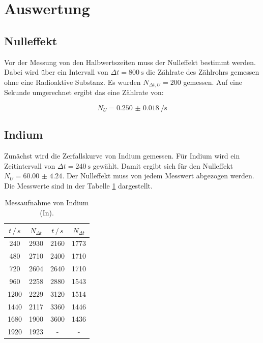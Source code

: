 \section{Auswertung}

\subsection{Nulleffekt}

Vor der Messung von den Halbwertszeiten muss der Nulleffekt bestimmt werden. Dabei
wird über ein Intervall von $\Delta t = \SI{800}{\second}$ die Zählrate des Zählrohrs
gemessen ohne eine Radioaktive Substanz. Es wurden $N_{\Delta t , U} = 200$ gemessen.
Auf eine Sekunde umgerechnet ergibt das eine Zählrate von:

\begin{equation*}
  N_U = \SI{0.250(18)}{\per\second}
\end{equation*}

\subsection{Indium}

Zunächst wird die Zerfallskurve von Indium gemessen. Für Indium wird ein Zeitintervall
von $\Delta t = \SI{240}{\second}$ gewählt. Damit ergibt sich für den Nulleffekt
$N_U = \num{60.00(424)}$. Der Nulleffekt muss von jedem Messwert abgezogen werden.
Die Messwerte sind in der Tabelle \ref{tab:1} dargestellt.

\begin{table}[H]
  \centering
  \caption{Messaufnahme von Indium (In).}
  \label{tab:1}
  \begin{tabular}{c c c c}
    \toprule
    $t \, /\, s$& $N_{\Delta t}$& $t \, /\, s$& $N_{\Delta t}$ \\
    \midrule
    240  &  2930 & 2160 & 1773\\
    480  &  2710 & 2400 & 1710\\
    720  &  2604 & 2640 & 1710\\
    960  &  2258 & 2880 & 1543\\
    1200 &  2229 & 3120 & 1514\\
    1440 &  2117 & 3360 & 1446\\
    1680 &  1900 & 3600 & 1436\\
    1920 &  1923 & - & -\\
    \bottomrule
  \end{tabular}
\end{table}

